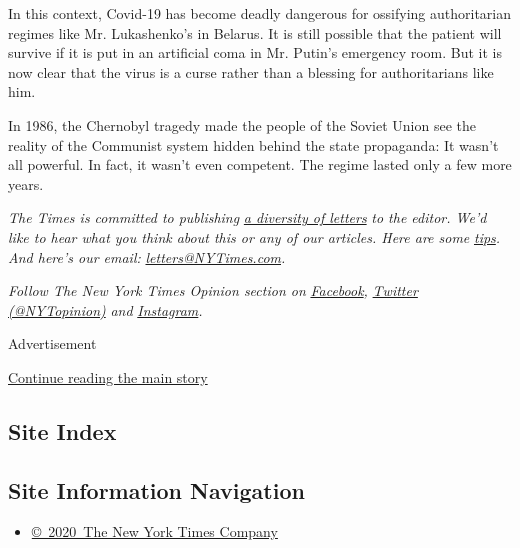 In this context, Covid-19 has become deadly dangerous for ossifying
authoritarian regimes like Mr. Lukashenko's in Belarus. It is still
possible that the patient will survive if it is put in an artificial
coma in Mr. Putin's emergency room. But it is now clear that the virus
is a curse rather than a blessing for authoritarians like him.

In 1986, the Chernobyl tragedy made the people of the Soviet Union see
the reality of the Communist system hidden behind the state propaganda:
It wasn't all powerful. In fact, it wasn't even competent. The regime
lasted only a few more years.

\emph{The Times is committed to publishing}
\href{https://www.nytimes3xbfgragh.onion/2019/01/31/opinion/letters/letters-to-editor-new-york-times-women.html}{\emph{a
diversity of letters}} \emph{to the editor. We'd like to hear what you
think about this or any of our articles. Here are some}
\href{https://help.nytimes3xbfgragh.onion/hc/en-us/articles/115014925288-How-to-submit-a-letter-to-the-editor}{\emph{tips}}\emph{.
And here's our email:}
\href{mailto:letters@NYTimes.com}{\emph{letters@NYTimes.com}}\emph{.}

\emph{Follow The New York Times Opinion section on}
\href{https://www.facebookcorewwwi.onion/nytopinion}{\emph{Facebook}}\emph{,}
\href{http://twitter.com/NYTOpinion}{\emph{Twitter (@NYTopinion)}}
\emph{and}
\href{https://www.instagram.com/nytopinion/}{\emph{Instagram}}\emph{.}

Advertisement

\protect\hyperlink{after-bottom}{Continue reading the main story}

\hypertarget{site-index}{%
\subsection{Site Index}\label{site-index}}

\hypertarget{site-information-navigation}{%
\subsection{Site Information
Navigation}\label{site-information-navigation}}

\begin{itemize}
\tightlist
\item
  \href{https://help.nytimes3xbfgragh.onion/hc/en-us/articles/115014792127-Copyright-notice}{©~2020~The
  New York Times Company}
\end{itemize}

